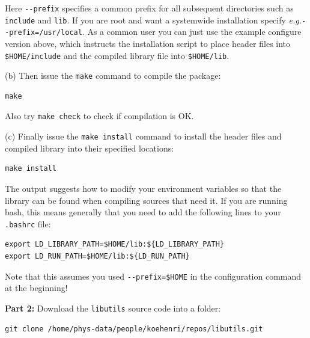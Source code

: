 \documentclass[a4paper,12pt,pdftex,onecolumn]{article}
\newcommand{\eg}{\emph{e.g.}\xspace}
\begin{document}
Here \verb+--prefix+ specifies a common prefix for all subsequent directories
such as \verb+include+ and \verb+lib+. If you are root and want a systemwide
installation specify \eg \verb+--prefix=/usr/local+. As a common user you
can just use the example configure version above,
which instructs the installation script to place header files into
\verb+$HOME/include+ and the compiled library file into \verb+$HOME/lib+.

(b) Then issue the \verb+make+ command to compile the package:

\begin{framed}
\begin{verbatim}
make
\end{verbatim}
\end{framed}

Also try \verb+make check+ to check if compilation is OK.

(c) Finally issue the \verb+make install+ command to install the header files and
compiled library into their specified locations:

\begin{framed}
\begin{verbatim}
make install
\end{verbatim}
\end{framed}

The output suggests how to modify your environment variables so that the library
can be found when compiling sources that need it. If you are running bash, this
means generally that you need to add the following lines to your \verb+.bashrc+ file:

\begin{framed}
\begin{verbatim}
export LD_LIBRARY_PATH=$HOME/lib:${LD_LIBRARY_PATH}
export LD_RUN_PATH=$HOME/lib:${LD_RUN_PATH}
\end{verbatim}
\end{framed}

Note that this assumes you used \verb+--prefix=$HOME+ in the configuration
command at the beginning!

{\large \bf Part 2:}
Download the \verb+libutils+ source code into a folder:

\begin{framed}
\begin{verbatim}
git clone /home/phys-data/people/koehenri/repos/libutils.git
\end{verbatim}
\end{framed}
\end{document}
